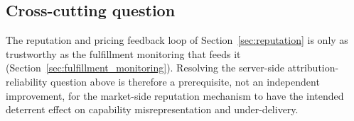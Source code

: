 \subsection{Cross-cutting question}
\label{sec:open_questions_cross}

The reputation and pricing feedback loop of Section~\ref{sec:reputation}
is only as trustworthy as the fulfillment monitoring that feeds it
(Section~\ref{sec:fulfillment_monitoring}). Resolving the server-side
attribution-reliability question above is therefore a prerequisite, not
an independent improvement, for the market-side reputation mechanism to
have the intended deterrent effect on capability misrepresentation and
under-delivery.
